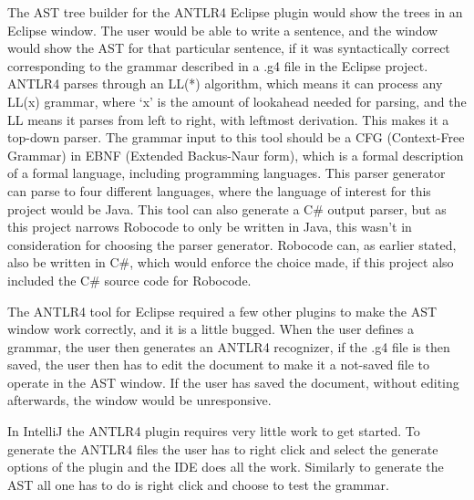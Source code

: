 The AST tree builder for the ANTLR4 Eclipse plugin would show the trees in an Eclipse window. The user would be able to write a sentence, and the window would show the AST for that particular sentence, if it was syntactically correct corresponding to the grammar described in a .g4 file in the Eclipse project.
ANTLR4 parses through an LL(*) algorithm, which means it can process any LL(x) grammar, where ‘x’ is the amount of lookahead needed for parsing, and the LL means it parses from left to right, with leftmost derivation. This makes it a top-down parser. The grammar input to this tool should be a CFG (Context-Free Grammar) in EBNF (Extended Backus-Naur form), which is a formal description of a formal language, including programming languages. This parser generator can parse to four different languages, where the language of interest for this project would be Java. This tool can also generate a C\# output parser, but as this project narrows Robocode to only be written in Java, this wasn't in consideration for choosing the parser generator. Robocode can, as earlier stated, also be written in C\#, which would enforce the choice made, if this project also included the C\# source code for Robocode.

The ANTLR4 tool for Eclipse required a few other plugins to make the AST window work correctly, and it is a little bugged. When the user defines a grammar, the user then generates an ANTLR4 recognizer, if the .g4 file is then saved, the user then has to edit the document to make it a not-saved file to operate in the AST window. If the user has saved the document, without editing afterwards, the window would be unresponsive.

In IntelliJ the ANTLR4 plugin requires very little work to get started. To generate the ANTLR4 files the user has to right click and select the generate options of the plugin and the IDE does all the work. Similarly to generate the AST all one has to do is right click and choose to test the grammar.